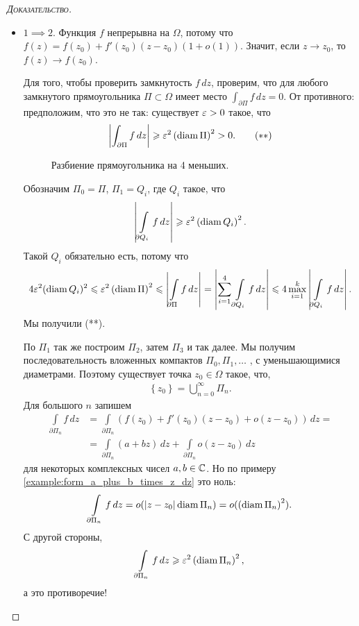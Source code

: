 \documentclass[../../main.tex]{subfiles}
\begin{document}
\begin{proof}[\normalfont\textsc{Доказательство}]\
 \begin{itemize}
  \item $1 \implies 2$. Функция $f$ непрерывна на $\Omega$, потому что $f(z) = f(z_0) + f'(z_0)(z-z_0)(1+o(1))$. Значит, если $z \to z_0$, то $f(z) \to f(z_0)$.

 Для того, чтобы проверить замкнутость $f \, dz$, проверим, что для любого замкнутого прямоугольника $\Pi \subset \Omega$ имеет место $\int_{\partial\Pi} f\,dz =0 $. От противного: предположим, что это не так: существует $\varepsilon > 0$ такое, что 
\begin{align*}
 \left|\int_{\partial\Pi} f\,dz  \right|  \geqslant \varepsilon^{2}\left( \operatorname{diam} \Pi \right)^{2} > 0. \qquad ( \ast\ast )
\end{align*}
\begin{figure}[ht]
    \centering
    \caption{Разбиение прямоугольника на 4 меньших.}
    \label{fig:theorem_cauchy_gurs_morer_rect}
\end{figure}

 Обозначим $\Pi_0 = \Pi$, $\Pi_1 = Q_i$, где $Q_i$ такое, что 
 \begin{align*}
  \left| \int\limits_{\partial Q_i}  f\,dz \right| \geqslant \varepsilon^{2} \left( \operatorname{diam} Q_i \right)^{2}.
 \end{align*} Такой $Q_i$ обязательно есть, потому что
 \begin{align*}
  4\varepsilon^{2}(\operatorname{diam} Q_i)^{2} \leqslant \varepsilon^{2} \left( \operatorname{diam} \Pi \right)^{2} \leqslant \left| \int\limits_{\partial \Pi} f\,dz   \right| = \left| \sum_{i=1}^{4} \int\limits_{\partial Q_i} f\,dz    \right| \leqslant 4 \max_{i=1}^{k} \left| \int\limits_{\partial Q_i} f\,dz   \right|.
 \end{align*} Мы получили (**).

 По $\Pi_1$ так же построим $\Pi_2$, затем $\Pi_3$ и так далее. Мы получим последовательность вложенных компактов  $\Pi_0, \Pi_1, \ldots$ , с уменьшающимися диаметрами. Поэтому существует точка $z_0 \in \Omega$ такое, что,
 \begin{align*}
  \left\{ z_0 \right\} = \bigcup_{n=0}^{\infty} \Pi_n.
 \end{align*} Для большого $n$ запишем
 \begin{align*}
  \int\limits_{\partial \Pi_n}  f\,dz &= \int\limits_{\partial\Pi_n}  \left( f(z_0) + f'(z_0)(z-z_0) + o(z - z_0) \right)\,dz = \\
  &= \int\limits_{\partial\Pi_n}  \left( a+bz \right)\,dz + \int\limits_{\partial\Pi_n}  o(z-z_0)\,dz
 \end{align*} для некоторых комплексных чисел $a,b \in \mathbb{C}$. Но по примеру \ref{example:form_a_plus_b_times_z_dz} это ноль:
 \begin{align*}
  \int\limits_{\partial\Pi_n} f\,dz  = o(\left| z-z_0 \right| \operatorname{diam} \Pi_n) = o(\left( \operatorname{diam} \Pi_n \right)^{2}).
 \end{align*} С другой стороны,
 \begin{align*}
  \int\limits_{\partial\Pi_n} f\,dz  \geqslant \varepsilon^{2}\left( \operatorname{diam} \Pi_n \right)^{2},
 \end{align*} а это противоречие!


\end{itemize}
\end{proof}
\end{document}
